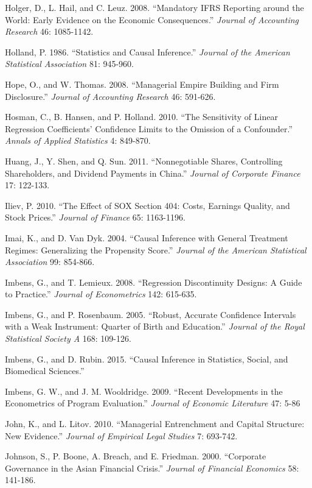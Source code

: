 \noindent Holger, D., L. Hail, and C. Leuz. 2008. ``Mandatory IFRS Reporting around the World: Early Evidence on the Economic Consequences.''  \textit{Journal of Accounting Research} 46: 1085-1142.

\noindent Holland, P. 1986. ``Statistics and Causal Inference.''  \textit{Journal of the American Statistical Association} 81: 945-960.

\noindent Hope, O., and W. Thomas. 2008. ``Managerial Empire Building and Firm Disclosure.'' \textit{Journal of Accounting Research} 46: 591-626.

\noindent Hosman, C., B. Hansen, and P. Holland. 2010. ``The Sensitivity of Linear Regression Coefficients' Confidence Limits to the Omission of a Confounder.''  \textit{Annals of Applied Statistics} 4: 849-870.

\noindent Huang, J., Y. Shen, and Q. Sun. 2011. ``Nonnegotiable Shares, Controlling Shareholders, and Dividend Payments in China.''  \textit{Journal of Corporate Finance} 17: 122-133.

\noindent Iliev, P. 2010. ``The Effect of SOX Section 404:  Costs, Earnings Quality, and Stock Prices.''  \textit{Journal of Finance} 65: 1163-1196.

\noindent Imai, K., and D. Van Dyk. 2004. ``Causal Inference with General Treatment Regimes: Generalizing the Propensity Score.''\textit{ Journal of the American Statistical Association }99: 854-866.

\noindent Imbens, G., and T. Lemieux. 2008. ``Regression Discontinuity Designs:  A Guide to Practice.'' \textit{Journal of Econometrics} 142: 615-635.

\noindent Imbens, G., and P. Rosenbaum. 2005. ``Robust, Accurate Confidence Intervals with a Weak Instrument:  Quarter of Birth and Education.'' \textit{Journal of the Royal Statistical Society A} 168: 109-126.

\noindent Imbens, G., and D. Rubin. 2015. ``Causal Inference in Statistics, Social, and Biomedical Sciences.''

\noindent Imbens, G. W., and J. M. Wooldridge.  2009.  ``Recent Developments in the Econometrics of Program Evaluation.''  \textit{Journal of Economic Literature} 47:  5-86

\noindent John, K., and L. Litov. 2010. ``Managerial Entrenchment and Capital Structure:  New Evidence.'' \textit{Journal of Empirical Legal Studies} 7: 693-742.

\noindent Johnson, S., P. Boone, A. Breach, and E. Friedman. 2000. ``Corporate Governance in the Asian Financial Crisis.''  \textit{Journal of Financial Economics} 58: 141-186.

